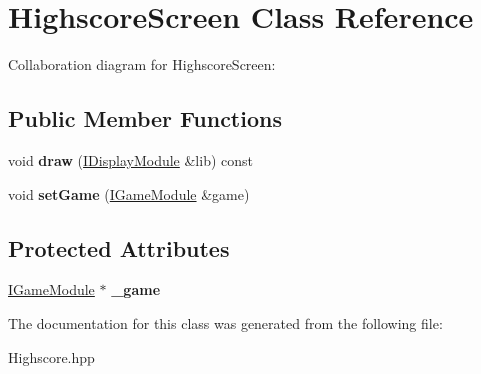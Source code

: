 \hypertarget{class_highscore_screen}{}\section{Highscore\+Screen Class Reference}
\label{class_highscore_screen}


Collaboration diagram for Highscore\+Screen\+:
\subsection*{Public Member Functions}
\begin{DoxyCompactItemize}
\item 
\mbox{\label{class_highscore_screen_a71bd440a67030300701f679d522daa82}} 
void {\bfseries draw} (\hyperlink{class_i_display_module}{I\+Display\+Module} \&lib) const
\item 
\mbox{\label{class_highscore_screen_a3a07f8a68a9bf90d9c7579a41fcc7582}} 
void {\bfseries set\+Game} (\hyperlink{class_i_game_module}{I\+Game\+Module} \&game)
\end{DoxyCompactItemize}
\subsection*{Protected Attributes}
\begin{DoxyCompactItemize}
\item 
\mbox{\label{class_highscore_screen_aefea427061a36c8d92b70946cd775bf5}} 
\hyperlink{class_i_game_module}{I\+Game\+Module} $\ast$ {\bfseries \+\_\+game}
\end{DoxyCompactItemize}


The documentation for this class was generated from the following file\+:\begin{DoxyCompactItemize}
\item 
Highscore.\+hpp\end{DoxyCompactItemize}
